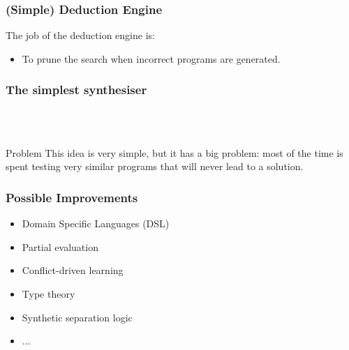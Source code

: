 \documentclass{beamer}
\theoremstyle{definition} %
\begin{document}
\begin{frame}[fragile]
    \frametitle{(Simple) Deduction Engine}

	The job of the deduction engine is:

	\begin{itemize}
		\item To prune the search when incorrect programs are generated.
	\end{itemize}


\end{frame}

\begin{frame}
    \frametitle{The simplest synthesiser}

	\centering
    ~\\~\\

	\pause

	\begin{alertblock}{Problem}
		This idea is very simple, but it has a big problem: most of the time is spent
		testing very similar programs that will never lead to a solution.
	\end{alertblock}

\end{frame}

\begin{frame}
	\frametitle{Possible Improvements}

	\begin{itemize}
		\item Domain Specific Languages (DSL)
		\item Partial evaluation
		\item Conflict-driven learning
		\item Type theory
		\item Synthetic separation logic
		\item ...
	\end{itemize}

\end{frame}
\end{document}
